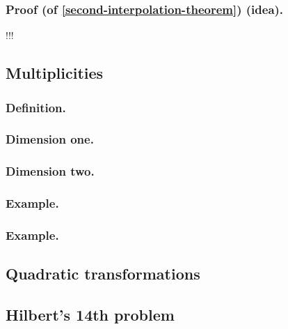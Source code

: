 \documentclass[10pt]{article}
\numberwithin{equation}{subsubsection}
\begin{document}
            \subsubsection{Proof (of \ref{second-interpolation-theorem}) (idea).} !!!
            
        \subsection{Multiplicities}
        
            \subsubsection{Definition.}
            
            \subsubsection{Dimension one.}
            
            \subsubsection{Dimension two.}
            
            \subsubsection{Example.}
            
            \subsubsection{Example.}
        
        \subsection{Quadratic transformations}
        
        \subsection{Hilbert's 14th problem}
    
\end{document}

